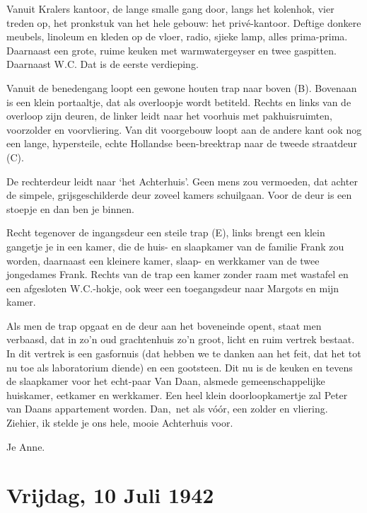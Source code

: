 \documentclass{book}
\begin{document}
Vanuit Kralers kantoor, de lange smalle gang door, langs het kolenhok, vier
treden op, het pronkstuk van het hele gebouw: het privé-kantoor.  Deftige
donkere meubels, linoleum en kleden op de vloer, radio, sjieke lamp, alles
prima-prima. Daarnaast een grote, ruime keuken met warmwatergeyser en twee
gaspitten. Daarnaast W.C. Dat is de eerste verdieping.

Vanuit de benedengang loopt een gewone houten trap naar boven (B).  Bovenaan is
een klein portaaltje, dat als overloopje wordt betiteld.  Rechts en links van de
overloop zijn deuren, de linker leidt naar het voorhuis met pakhuisruimten,
voorzolder en voorvliering. Van dit voorgebouw loopt aan de andere kant ook nog
een lange, hypersteile, echte Hollandse been-breektrap naar de tweede straatdeur
(C).

De rechterdeur leidt naar `het Achterhuis'. Geen mens zou vermoeden, dat achter
de simpele, grijsgeschilderde deur zoveel kamers schuilgaan. Voor de deur is een
stoepje en dan ben je binnen.

Recht tegenover de ingangsdeur een steile trap (E), links brengt een klein
gangetje je in een kamer, die de huis- en slaapkamer van de familie Frank zou
worden, daarnaast een kleinere kamer, slaap- en werkkamer van de twee jongedames
Frank. Rechts van de trap een kamer zonder raam met wastafel en een afgesloten
W.C.-hokje, ook weer een toegangsdeur naar Margots en mijn kamer.

Als men de trap opgaat en de deur aan het boveneinde opent, staat men verbaasd,
dat in zo'n oud grachtenhuis zo'n groot, licht en ruim vertrek bestaat. In dit
vertrek is een gasfornuis (dat hebben we te danken aan het feit, dat het tot nu
toe als laboratorium diende) en een gootsteen.  Dit nu is de keuken en tevens de
slaapkamer voor het echt-paar Van Daan, alsmede gemeenschappelijke huiskamer,
eetkamer en werkkamer. Een heel klein doorloopkamertje zal Peter van Daans
appartement worden. Dan,~net als vóór, een zolder en vliering. Ziehier, ik
stelde je ons hele, mooie Achterhuis voor.

Je Anne.

\section*{Vrijdag, 10 Juli 1942}
\end{document}
